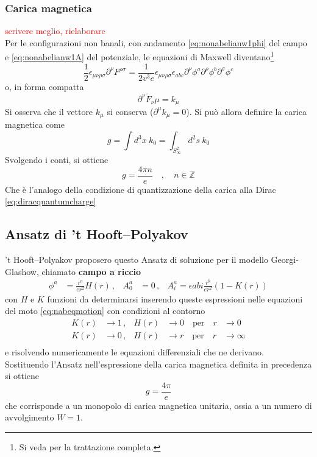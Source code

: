 \subsubsection{Carica magnetica}
\textcolor{red}{scrivere meglio, rielaborare}\\
Per le configurazioni non banali, con andamento \ref{eq:nonabelianw1phi} del campo
e \ref{eq:nonabelianw1A} del potenziale, le equazioni di Maxwell diventano\footnote{
   Si veda \cite{nakahara} per la trattazione completa.
}
$$
   \frac{1}{2} \epsilon_{\mu\nu\rho\sigma} \partial ^\nu F^{\rho\sigma} =
       \frac{1}{2 v^3 e} \epsilon_{\mu\nu\rho\sigma}\epsilon_{abc}
       \partial^\nu \phi^a \partial^\rho \phi^b \partial^\sigma \phi^c
$$
o, in forma compatta
$$
   \partial ^\nu \tilde{F}_\nu\mu = k_\mu
$$
Si osserva che il vettore $k_\mu$ si conserva ($\partial ^\mu k_\mu = 0$).
Si può allora definire la carica magnetica come
$$
   g = \int d^3 x \: k_0 = \int_{S^2_\infty} d^2s \: k_0
$$
Svolgendo i conti, si ottiene
\begin{equation}\label{eq:nonabelianquantumcharge}
   g = \frac{4\pi n}{e} \quad,\quad n \in \mathbb{Z}
\end{equation}
Che è l'analogo della condizione di quantizzazione della carica alla Dirac
\ref{eq:diracquantumcharge}

\subsection{Ansatz di ’t Hooft–Polyakov}
’t Hooft–Polyakov proposero questo Ansatz di soluzione per il modello Georgi-Glashow,
chiamato \textbf{campo a riccio}
\begin{equation}
   \begin{aligned}
      \phi^a & = \frac{r^a}{er^2}H(r) \, ,&
      A_0^a & = 0 \, ,&
      A_i^a = \epsilon{abi}\frac{r^b}{er^2}(1-K(r))
   \end{aligned}
\end{equation}
con $H$ e $K$ funzioni da determinarsi inserendo queste espressioni nelle equazioni
del moto \ref{eq:nabeqmotion} con condizioni al contorno
\begin{equation}
   \begin{aligned}
      K(r) &\to 1 \, ,& H(r) &\to 0 \quad \mathrm{per} \quad r & \to 0 \\
      K(r) &\to 0 \, ,& H(r) &\to r \quad \mathrm{per} \quad r & \to \infty \\
   \end{aligned}
\end{equation}
e risolvendo numericamente le equazioni differenziali che ne derivano.\\

Sostituendo l'Ansatz nell'espressione della carica magnetica definita in precedenza
si ottiene
\begin{equation}
   g = \frac{4\pi}{e}
\end{equation}
che corrisponde a un monopolo di carica magnetica unitaria, ossia a un
numero di avvolgimento $W = 1$.\\
